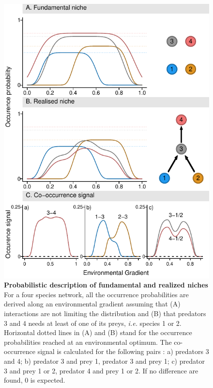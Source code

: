\begin{figure}[htbp]
\centering
\includegraphics{chapitre3/figConcept.pdf}
\caption{\textbf{Probabilistic description of fundamental and realized
niches} For a four species network, all the occurrence probabilities are
derived along an environmental gradient assuming that (A) interactions
are not limiting the distribution and (B) that predators 3 and 4 needs
at least of one of its preys, \emph{i.e.} species 1 or 2. Horizontal
dotted lines in (A) and (B) stand for the occurrence probabilities
reached at an environmental optimum. The co-occurrence signal is
calculated for the following pairs : a) predators 3 and 4; b) predator 3
and prey 1, predator 3 and prey 1; c) predator 3 and prey 1 or 2,
predator 4 and prey 1 or 2. If no difference are found, 0 is
expected.\label{fig:box1}}
\end{figure}

\newpage

